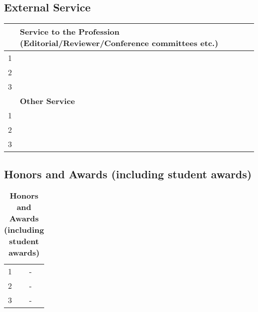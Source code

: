 \documentclass[11pt]{article}
\begin{document}
\subsection{External Service}
  \begin{tabular}{ll}
    \toprule
    \textbf{}& \textbf{Service to the Profession (Editorial/Reviewer/Conference committees etc.)}\\
      \midrule
    1& \\
    2& \\
    3& \\
    \toprule
    \textbf{}& \textbf{Other Service}\\
      \midrule
    1& \\
    2& \\
    3& \\
    \bottomrule
  \end{tabular}


\subsection{Honors and Awards (including student awards)}
\begin{table}[h]
  \centering
  \caption{\textbf{Honors and Awards (including student awards)}\label{tab:honors-and-awards}}
  \begin{tabular}{ll}
    \toprule
    1& -\\
    2& -\\
    3& -\\
    \bottomrule
  \end{tabular}
\end{table}
\end{document}
